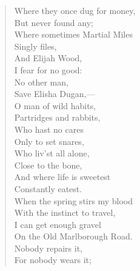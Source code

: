 \documentclass[twoside,openright,10pt]{memoir} %
\begin{document}
\begin{verse}
\hspace{2em}Where they once dug for money,\\
\hspace{2em}But never found any; \\
\hspace{2em}Where sometimes Martial Miles \\
\hspace{2em}Singly files, \\
\hspace{2em}And Elijah Wood, \\
\hspace{2em}I fear for no good: \\
\hspace{2em}No other man, \\
\hspace{2em}Save Elisha Dugan,— \\
\hspace{2em}O man of wild habits, \\
\hspace{2em}Partridges and rabbits, \\
\hspace{2em}Who hast no cares \\
\hspace{2em}Only to set snares, \\
\hspace{2em}Who liv’st all alone, \\
\hspace{2em}Close to the bone, \\
\hspace{2em}And where life is sweetest \\
\hspace{2em}Constantly eatest. \\
\hspace{0em}When the spring stirs my blood \\
\hspace{1em}With the instinct to travel, \\
\hspace{1em}I can get enough gravel \\
\hspace{0em}On the Old Marlborough Road. \\
\hspace{2em}Nobody repairs it, \\
\hspace{2em}For nobody wears it; \\

\end{verse}
\end{document}

